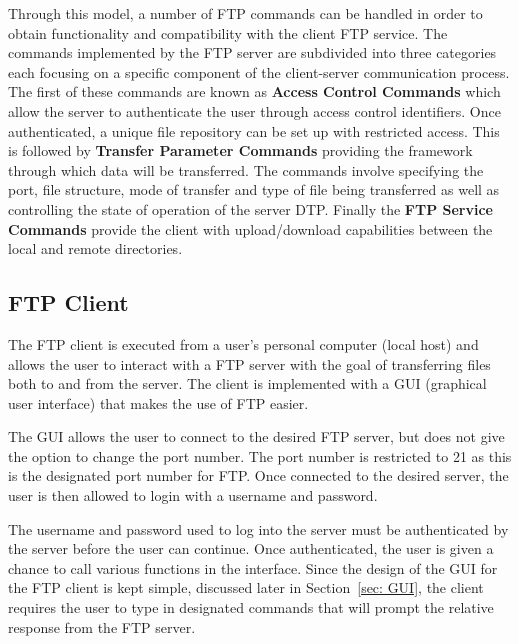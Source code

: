 \documentclass[10pt,twocolumn]{witseiepaper}
\begin{document}
Through this model, a number of FTP commands can be handled in order to obtain functionality and compatibility with the client FTP service. The commands implemented by the FTP server are subdivided into three categories each focusing on a specific component of the client-server communication process\cite{RFC959}. The first of these commands are known as \textbf{Access Control Commands} which allow the server to authenticate the user through access control identifiers. Once authenticated, a unique file repository can be set up with restricted access. This is followed by \textbf{Transfer Parameter Commands} providing the framework through which data will be transferred. The commands involve specifying the port, file structure, mode of transfer and type of file being transferred as well as controlling the state of operation of the server DTP. Finally the \textbf{FTP Service Commands} provide the client with upload/download capabilities between the local and remote directories.


\subsection{FTP Client}
\label{sec: FTP Client}
The FTP client is executed from a user's personal computer (local host) and allows the user to interact with a FTP server with the goal of transferring files both to and from the server. The client is implemented with a GUI (graphical user interface) that makes the use of FTP easier.

The GUI allows the user to connect to the desired FTP server, but does not give the option to change the port number. The port number is restricted to 21 as this is the designated port number for FTP. Once connected to the desired server, the user is then allowed to login with a username and password.

The username and password used to log into the server must be authenticated by the server before the user can continue. Once authenticated, the user is given a chance to call various functions in the interface. Since the design of the GUI for the FTP client is kept simple, discussed later in Section~\ref{sec: GUI}, the client requires the user to type in designated commands that will prompt the relative response from the FTP server.
\end{document}
